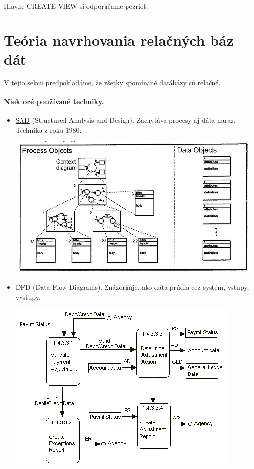 \documentclass[10pt,a4paper]{article}
\begin{document}
Hlavne CREATE VIEW si odporúčame pozrieť.

\section{Teória navrhovania relačných báz dát}

V tejto sekcii predpokladáme, že všetky spomínané datábázy sú relačné.

\paragraph{Niektoré používané techniky.}
\begin{itemize}
\item \href{http://en.wikipedia.org/wiki/Structured_analysis}{SAD} (Structured Analysis and Design). Zachytáva procesy aj dáta naraz. Technika z roku 1980.
\begin{center}
\includegraphics[scale=0.5]{db_sad.jpg}
\end{center}
\item DFD (Data-Flow Diagrams). Znázorňuje, ako dáta prúdia cez systém, vstupy, výstupy.
\begin{center}
\includegraphics[scale=0.75]{db_dfd.png}

\end{center}
\end{itemize}
\end{document}
